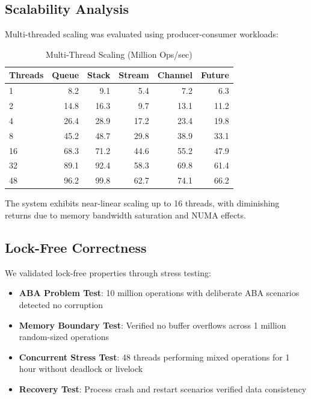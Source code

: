 \documentclass[10pt,conference]{IEEEtran}
\begin{document}
\subsection{Scalability Analysis}

Multi-threaded scaling was evaluated using producer-consumer workloads:

\begin{table}[h]
\centering
\caption{Multi-Thread Scaling (Million Ops/sec)}
\label{tab:scaling}
\begin{tabular}{lrrrrr}
\toprule
Threads & Queue & Stack & Stream & Channel & Future \\
\midrule
1 & 8.2 & 9.1 & 5.4 & 7.2 & 6.3 \\
2 & 14.8 & 16.3 & 9.7 & 13.1 & 11.2 \\
4 & 26.4 & 28.9 & 17.2 & 23.4 & 19.8 \\
8 & 45.2 & 48.7 & 29.8 & 38.9 & 33.1 \\
16 & 68.3 & 71.2 & 44.6 & 55.2 & 47.9 \\
32 & 89.1 & 92.4 & 58.3 & 69.8 & 61.4 \\
48 & 96.2 & 99.8 & 62.7 & 74.1 & 66.2 \\
\bottomrule
\end{tabular}
\end{table}

The system exhibits near-linear scaling up to 16 threads, with diminishing returns due to memory bandwidth saturation and NUMA effects.

\subsection{Lock-Free Correctness}

We validated lock-free properties through stress testing:

\begin{itemize}
\item \textbf{ABA Problem Test}: 10 million operations with deliberate ABA scenarios detected no corruption
\item \textbf{Memory Boundary Test}: Verified no buffer overflows across 1 million random-sized operations
\item \textbf{Concurrent Stress Test}: 48 threads performing mixed operations for 1 hour without deadlock or livelock
\item \textbf{Recovery Test}: Process crash and restart scenarios verified data consistency
\end{itemize}
\end{document}

